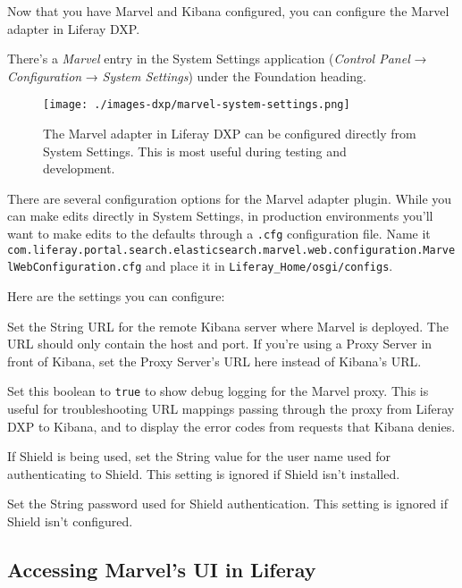 Now that you have Marvel and Kibana configured, you can configure the
Marvel adapter in Liferay DXP.

There's a \emph{Marvel} entry in the System Settings application
(\emph{Control Panel} → \emph{Configuration} → \emph{System Settings})
under the Foundation heading.

\begin{figure}
\centering
\texttt{[image: ./images-dxp/marvel-system-settings.png]}
\caption{The Marvel adapter in Liferay DXP can be configured directly
from System Settings. This is most useful during testing and
development.}
\end{figure}

There are several configuration options for the Marvel adapter plugin.
While you can make edits directly in System Settings, in production
environments you'll want to make edits to the defaults through a
\texttt{.cfg} configuration file. Name it
\texttt{com.liferay.portal.search.elasticsearch.marvel.web.configuration.MarvelWebConfiguration.cfg}
and place it in \texttt{Liferay\_Home/osgi/configs}.

Here are the settings you can configure:

\begin{description}
\tightlist
\item[\texttt{kibanaURL=http://localhost:5601}]
Set the String URL for the remote Kibana server where Marvel is
deployed. The URL should only contain the host and port. If you're using
a Proxy Server in front of Kibana, set the Proxy Server's URL here
instead of Kibana's URL.
\item[\texttt{proxyServletLogEnable=false}]
Set this boolean to \texttt{true} to show debug logging for the Marvel
proxy. This is useful for troubleshooting URL mappings passing through
the proxy from Liferay DXP to Kibana, and to display the error codes
from requests that Kibana denies.
\item[\texttt{shieldUserName=liferay}]
If Shield is being used, set the String value for the user name used for
authenticating to Shield. This setting is ignored if Shield isn't
installed.
\item[\texttt{shieldPassword=liferay}]
Set the String password used for Shield authentication. This setting is
ignored if Shield isn't configured.
\end{description}

\subsection{Accessing Marvel's UI in
Liferay}\label{accessing-marvels-ui-in-liferay}

